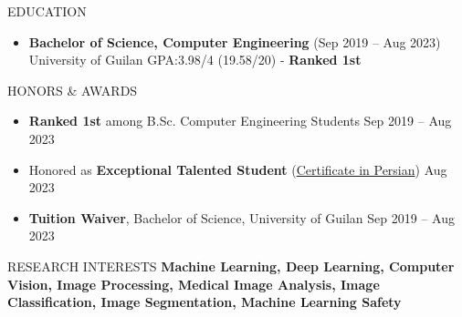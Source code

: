 \documentclass[]{CV}
\begin{document}
\resumeheader
{}
{}
{}
{}


\vspace{-3.7mm}
\begin{flushright}
\end{flushright}

\vspace{-6mm}
\begin{section}{EDUCATION}
\begin{itemize}
\item \textbf{Bachelor of Science, Computer Engineering} \hfill (Sep 2019 -- Aug 2023)\newline
{University of Guilan \newline GPA:3.98/4 (19.58/20) - \textbf{Ranked 1st}}
\end{itemize}
\end{section}


\begin{section}{HONORS \& AWARDS}
\begin{itemize}
\item \textbf{Ranked 1st} among B.Sc. Computer Engineering Students \hfill Sep 2019 -- Aug 2023 


\item Honored as \textbf{Exceptional Talented Student} (\href{https://drive.google.com/file/d/1RfuN4xRnWvJ53gFADrlBrSxIEHqgPVWS/view?usp=sharing}{Certificate in Persian}) \hfill Aug 2023

\item \textbf{Tuition Waiver}, Bachelor of Science, University of Guilan \hfill Sep 2019 -- Aug 2023 
\end{itemize}
\end{section}

\begin{section}{RESEARCH INTERESTS}
    \textbf{Machine Learning, Deep Learning, Computer Vision, Image Processing, Medical Image Analysis, Image Classification, Image Segmentation, Machine Learning Safety}
\end{section}
\end{document}
